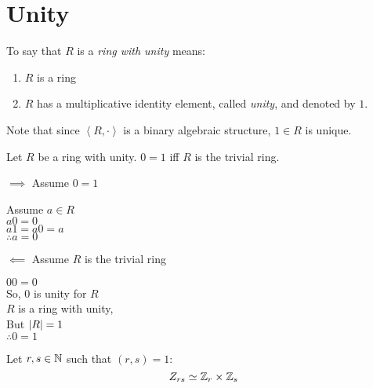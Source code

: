 \documentclass[letterpaper,12pt,fleqn]{article}
\begin{document}
\section*{Unity}

\begin{definition}
  To say that $R$ is a \emph{ring with unity} means:
  \begin{enumerate}
  \item $R$ is a ring
  \item $R$ has a multiplicative identity element, called \emph{unity}, and
    denoted by $1$.
  \end{enumerate}
\end{definition}

Note that since $\left<R,\cdot\right>$ is a binary algebraic structure, $1\in R$ is
unique.

\begin{theorem}
  Let $R$ be a ring with unity. $0=1$ iff $R$ is the trivial ring.
\end{theorem}

\begin{theproof}
  \listbreak
  \begin{description}
  \item $\implies$ Assume $0=1$
    
    Assume $a\in R$ \\
    $a0=0$ \\
    $a1=a0=a$ \\
    $\therefore a=0$

  \item $\impliedby$ Assume $R$ is the trivial ring

    $00=0$ \\
    So, $0$ is unity for $R$ \\
    $R$ is a ring with unity, \\
    But $\lvert R\rvert=1$ \\
    $\therefore 0=1$
  \end{description}
\end{theproof}

\begin{theorem}
  Let $r,s\in\mathbb{N}$ such that $(r,s)=1$:
  \[Z_{rs}\simeq\mathbb{Z}_r\times\mathbb{Z}_s\]
\end{theorem}
\end{document}
